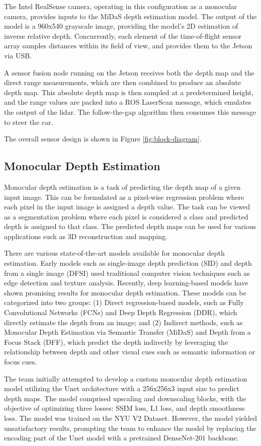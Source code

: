 \documentclass[conference]{IEEEtran}
\begin{document}
The Intel RealSense camera, operating in this configuration as a monocular
camera, provides inputs to the MiDaS depth estimation model. The output of the
model is a 960x540 grayscale image, providing the model's 2D estimation of
inverse relative depth. Concurrently, each element of the time-of-flight sensor
array samples distances within its field of view, and provides them to the
Jetson via USB.

A sensor fusion node running on the Jetson receives both the depth map and the
direct range measurements, which are then combined to produce an absolute depth
map. This absolute depth map is then sampled at a predetermined height, and the
range values are packed into a ROS LaserScan message, which emulates the output
of the lidar. The follow-the-gap algorithm then consumes this message to steer
the car.

The overall sensor design is shown in Figure \ref{fig:block-diagram}.

\subsection{Monocular Depth Estimation}
Monocular depth estimation is a task of predicting the depth map of a given input image. This can be formulated as a pixel-wise regression problem where each pixel in the input image is assigned a depth value. The task can be viewed as a segmentation problem where each pixel is considered a class and predicted depth is assigned to that class. The predicted depth maps can be used for various applications such as 3D reconstruction and mapping.

There are various state-of-the-art models available for monocular depth estimation. Early models such as single-image depth prediction (SID) and depth from a single image (DFSI) used traditional computer vision techniques such as edge detection and texture analysis. Recently, deep learning-based models have shown promising results for monocular depth estimation. These models can be categorized into two groups: (1) Direct regression-based models, such as Fully Convolutional Networks (FCNs) and Deep Depth Regression (DDR), which directly estimate the depth from an image; and (2) Indirect methods, such as Monocular Depth Estimation via Semantic Transfer (MiDaS) and Depth from a Focus Stack (DFF), which predict the depth indirectly by leveraging the relationship between depth and other visual cues such as semantic information or focus cues.

The team initially attempted to develop a custom monocular depth estimation model utilizing the Unet architecture with a 256x256x3 input size to predict depth maps. The model comprised upscaling and downscaling blocks, with the objective of optimizing three losses: SSIM loss, L1 loss, and depth smoothness loss. The model was trained on the NYU V2 Dataset. However, the model yielded unsatisfactory results, prompting the team to enhance the model by replacing the encoding part of the Unet model with a pretrained DenseNet-201 backbone.
\end{document}

